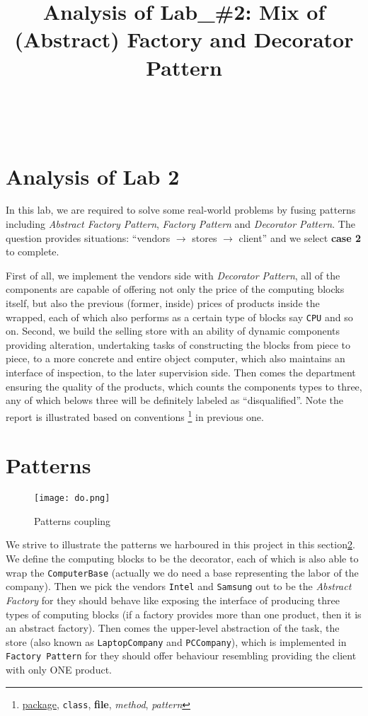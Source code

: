 \documentclass[a4paper]{article}
\title{Analysis of Lab\_\#2: Mix of (Abstract) Factory and Decorator Pattern}
\makeatletter
\renewcommand{\maketitle}{\bgroup\setlength{\parindent}{0pt}
    \begin{center}

        \textbf{\Large\@title} \\[12pt]


        \par\vspace{\baselineskip}
    \end{center}

\egroup}
\makeatother
\begin{document}
\maketitle


\section{Analysis of Lab 2}%
\label{sec:analysis_of_lab_2}

In this lab, we are required to solve some real-world problems
by fusing patterns including \textit{Abstract Factory Pattern},
\textit{Factory Pattern} and \textit{Decorator Pattern}. The question
provides situations: ``vendors $\to$ stores $\to$ client'' and we
select \textbf{case 2} to complete.

First of all, we implement the vendors side with \textit{Decorator Pattern},
all of the components are capable of offering not only the price
of the computing blocks itself, but also the previous (former, inside)
prices of products inside the wrapped, each of which also performs
as a certain type of blocks say \texttt{CPU} and so on. Second, we
build the selling store with an ability of dynamic components
providing alteration, undertaking tasks of constructing the blocks
from piece to piece, to a more concrete and entire object computer,
which also maintains an interface of inspection, to the later supervision
side. Then comes the department ensuring the quality of the products,
which counts the components types to three, any of which belows three
will be definitely labeled as ``disqualified''. Note the report
is illustrated based on conventions
\footnote{\underline{package}, \texttt{class}, \textbf{file}, \textsl{method}, \textit{pattern}}
in previous one.

\section{Patterns}%
\label{sec:patterns}

\begin{figure}[h]
    \centering
    \texttt{[image: do.png]}
    \caption{Patterns coupling}
    \label{fig:pattern_coupling}
\end{figure}

We strive to illustrate the patterns we harboured in this project in this section\ref{sec:patterns}.
We define the computing blocks to be the decorator, each of which is
also able to wrap the \texttt{ComputerBase} (actually we do need a base representing the labor of
the company). Then we pick the vendors \texttt{Intel} and \texttt{Samsung}
out to be the \textit{Abstract Factory} for they should behave like
exposing the interface of producing three types of computing blocks
(if a factory provides more than one product, then it is an abstract factory).
Then comes the upper-level abstraction of the task, the store (also known as \texttt{LaptopCompany} and \texttt{PCCompany}),
which is implemented in \texttt{Factory Pattern} for they should
offer behaviour resembling providing the client with only ONE product.
\end{document}
